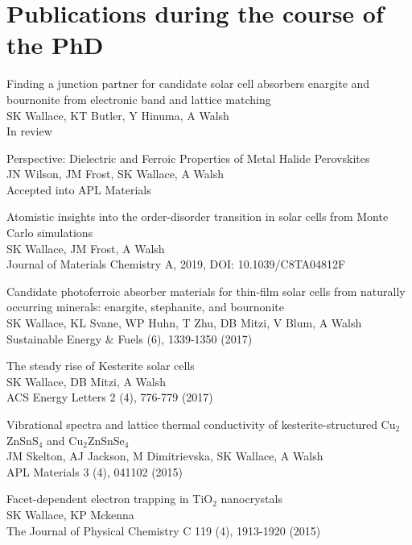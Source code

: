 \documentclass[11pt, twoside]{report}
\begin{document}
\section*{Publications during the course of the PhD}
\begin{etaremune}
\item Finding a junction partner for candidate solar cell absorbers enargite and bournonite from electronic band and lattice matching\\
SK Wallace, KT Butler, Y Hinuma, A Walsh\\
In review
\item Perspective: Dielectric and Ferroic Properties of Metal Halide Perovskites\\
JN Wilson, JM Frost, SK Wallace, A Walsh\\
Accepted into APL Materials
\item Atomistic insights into the order-disorder transition in {\CZTS} solar cells from Monte Carlo simulations \\
SK Wallace, JM Frost, A Walsh\\
Journal of Materials Chemistry A, 2019, DOI: 10.1039/C8TA04812F
\item Candidate photoferroic absorber materials for thin-film solar cells from naturally occurring minerals: enargite, stephanite, and bournonite\\
SK Wallace, KL Svane, WP Huhn, T Zhu, DB Mitzi, V Blum, A Walsh\\ Sustainable Energy \& Fuels  (6), 1339-1350 (2017)
\item The steady rise of Kesterite solar cells\\ SK Wallace, DB Mitzi, A Walsh\\ ACS Energy Letters 2 (4), 776-779 (2017)
\item Vibrational spectra and lattice thermal conductivity of kesterite-structured Cu$_2$ZnSnS$_4$ and Cu$_2$ZnSnSe$_4$\\ JM Skelton, AJ Jackson, M Dimitrievska, SK Wallace, A Walsh\\ APL Materials 3 (4), 041102 (2015)
\item Facet-dependent electron trapping in TiO$_2$ nanocrystals\\ SK Wallace, KP Mckenna\\ The Journal of Physical Chemistry C 119 (4), 1913-1920 (2015)
\end{etaremune}


\tableofcontents
{}
\listoffigures
{}
\listoftables
{}
\end{document}
